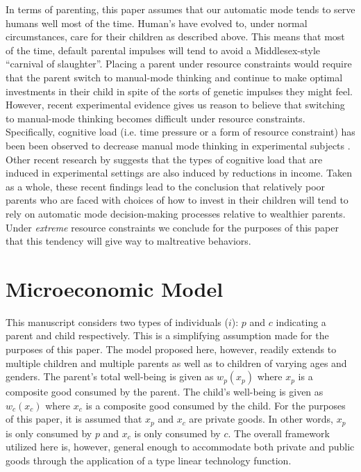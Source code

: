 \documentclass[1p, review]{elsarticle}\usepackage[]{graphicx}\usepackage[]{color}
\begin{document}
In terms of parenting, this paper assumes that our automatic mode tends to serve humans well most of the time. Human's have evolved to, under normal circumstances, care for their children as described above. This means that most of the time, default parental impulses will tend to avoid a Middlesex-style ``carnival of slaughter''. Placing a parent under resource constraints would require that the parent switch to manual-mode thinking and continue to make optimal investments in their child in spite of the sorts of genetic impulses they might feel. However, recent experimental evidence gives us reason to believe that switching to manual-mode thinking becomes difficult under resource constraints. Specifically, cognitive load (i.e. time pressure or a form of resource constraint) has been been observed to decrease manual mode thinking in experimental subjects \citep{Suter2011, Paxton2012}. Other recent research by \citet{Mani2013} suggests that the types of cognitive load that are induced in experimental settings are also induced by reductions in income. Taken as a whole, these recent findings lead to the conclusion that relatively poor parents who are faced with choices of how to invest in their children will tend to rely on automatic mode decision-making processes relative to wealthier parents. Under \emph{extreme} resource constraints we conclude for the purposes of this paper that this tendency will give way to maltreative behaviors. 

\section{Microeconomic Model}

This manuscript considers two types of individuals ($i$): $p$ and $c$
indicating a parent and child respectively. This is a simplifying
assumption made for the purposes of this paper. The model proposed here,
however, readily extends to multiple children and multiple parents as
well as to children of varying ages and genders. The parent's total
well-being is given as $w_p(x_p)$ where $x_p$ is a composite good
consumed by the parent. The child's well-being is given as $w_c(x_c)$
where $x_c$ is a composite good consumed by the child. For the purposes
of this paper, it is assumed that $x_p$ and $x_c$ are private goods. In
other words, $x_p$ is only consumed by $p$ and $x_c$ is only consumed by
$c$. The overall framework utilized here is, however, general enough to
accommodate both private and public goods through the application of a \citet{Gorman1976} type linear technology function.
\end{document}
